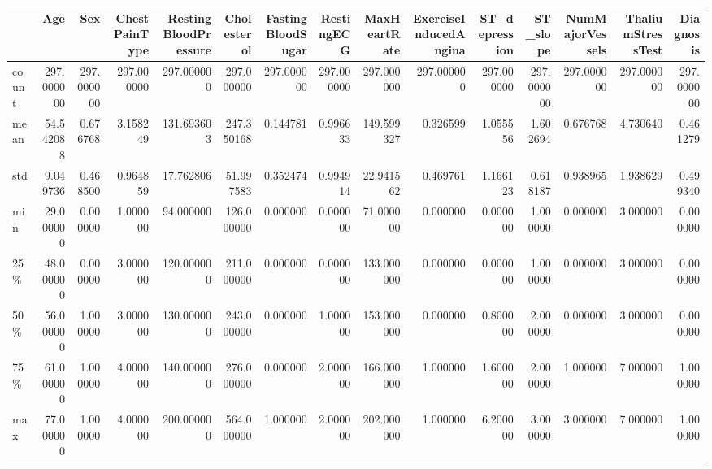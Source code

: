 \begin{tabular}{lrrrrrrrrrrrrrr}
\toprule
{} &         Age &         Sex &  ChestPainType &  RestingBloodPressure &  Cholesterol &  FastingBloodSugar &  RestingECG &  MaxHeartRate &  ExerciseInducedAngina &  ST\_depression &    ST\_slope &  NumMajorVessels &  ThaliumStressTest &   Diagnosis \\
\midrule
count &  297.000000 &  297.000000 &     297.000000 &            297.000000 &   297.000000 &         297.000000 &  297.000000 &    297.000000 &             297.000000 &     297.000000 &  297.000000 &       297.000000 &         297.000000 &  297.000000 \\
mean  &   54.542088 &    0.676768 &       3.158249 &            131.693603 &   247.350168 &           0.144781 &    0.996633 &    149.599327 &               0.326599 &       1.055556 &    1.602694 &         0.676768 &           4.730640 &    0.461279 \\
std   &    9.049736 &    0.468500 &       0.964859 &             17.762806 &    51.997583 &           0.352474 &    0.994914 &     22.941562 &               0.469761 &       1.166123 &    0.618187 &         0.938965 &           1.938629 &    0.499340 \\
min   &   29.000000 &    0.000000 &       1.000000 &             94.000000 &   126.000000 &           0.000000 &    0.000000 &     71.000000 &               0.000000 &       0.000000 &    1.000000 &         0.000000 &           3.000000 &    0.000000 \\
25\%   &   48.000000 &    0.000000 &       3.000000 &            120.000000 &   211.000000 &           0.000000 &    0.000000 &    133.000000 &               0.000000 &       0.000000 &    1.000000 &         0.000000 &           3.000000 &    0.000000 \\
50\%   &   56.000000 &    1.000000 &       3.000000 &            130.000000 &   243.000000 &           0.000000 &    1.000000 &    153.000000 &               0.000000 &       0.800000 &    2.000000 &         0.000000 &           3.000000 &    0.000000 \\
75\%   &   61.000000 &    1.000000 &       4.000000 &            140.000000 &   276.000000 &           0.000000 &    2.000000 &    166.000000 &               1.000000 &       1.600000 &    2.000000 &         1.000000 &           7.000000 &    1.000000 \\
max   &   77.000000 &    1.000000 &       4.000000 &            200.000000 &   564.000000 &           1.000000 &    2.000000 &    202.000000 &               1.000000 &       6.200000 &    3.000000 &         3.000000 &           7.000000 &    1.000000 \\
\bottomrule
\end{tabular}
